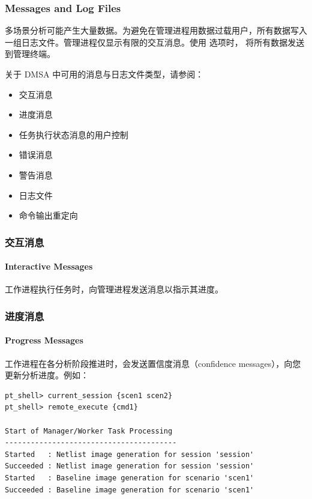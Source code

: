 \subsubsection*{Messages and Log Files}

多场景分析可能产生大量数据。为避免在管理进程用数据过载用户，所有数据写入一组日志文件。管理进程仅显示有限的交互消息。使用  选项时， 将所有数据发送到管理终端。

关于 DMSA 中可用的消息与日志文件类型，请参阅：
\begin{itemize}
  \item 交互消息
  \item 进度消息
  \item 任务执行状态消息的用户控制
  \item 错误消息
  \item 警告消息
  \item 日志文件
  \item 命令输出重定向
\end{itemize}

\subsubsection{交互消息}
\paragraph*{Interactive Messages}

工作进程执行任务时，向管理进程发送消息以指示其进度。

\subsubsection{进度消息}
\paragraph*{Progress Messages}

工作进程在各分析阶段推进时，会发送置信度消息（confidence messages），向您更新分析进度。例如：
\begin{lstlisting}
pt_shell> current_session {scen1 scen2}
pt_shell> remote_execute {cmd1}

Start of Manager/Worker Task Processing
----------------------------------------
Started   : Netlist image generation for session 'session'
Succeeded : Netlist image generation for session 'session'
Started   : Baseline image generation for scenario 'scen1'
Succeeded : Baseline image generation for scenario 'scen1'
\end{lstlisting}

